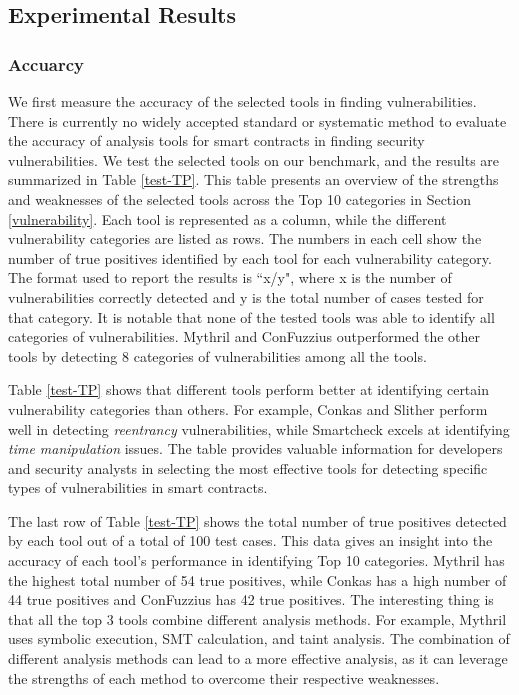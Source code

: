 \documentclass[manuscript,screen]{acmart}
\begin{document}
\subsection{Experimental Results}

\subsubsection{Accuarcy}
We first measure the accuracy of the selected tools in finding vulnerabilities.  There is currently no widely accepted standard or systematic method to evaluate the accuracy of analysis tools for smart contracts in finding security vulnerabilities. 
We test the selected tools on our benchmark, and the results are summarized in Table \ref{test-TP}. This table presents an overview of the strengths and weaknesses of the selected tools across the Top 10 categories in Section \ref{vulnerability}.  Each tool is represented as a column, while the different vulnerability categories are listed as rows. The numbers in each cell show
the number of true positives identified by each tool for each vulnerability category. The format used to report the results is ``x/y", where x is the number of vulnerabilities correctly detected and y is the total number of cases tested for that category.
It is notable that none of the tested tools was able to identify all categories of vulnerabilities. Mythril and ConFuzzius outperformed the other tools by detecting 8 categories of vulnerabilities among all the tools. 

Table \ref{test-TP} shows that different tools perform better at identifying certain vulnerability categories than others. For example, Conkas and Slither perform well in detecting \textit{reentrancy} vulnerabilities, while Smartcheck excels at identifying \textit{time manipulation} issues. The table provides valuable information for developers and security analysts in selecting the most effective tools for detecting specific types of vulnerabilities in smart contracts.

The last row of Table \ref{test-TP} shows the total number of true positives detected by each tool out of a total of 100 test cases. This data gives an insight into the accuracy of each tool's performance in identifying Top 10 categories.
Mythril has the highest total number of 54 true positives, while Conkas has a high number of 44 true positives and ConFuzzius has 42 true positives. The interesting thing is that all the top 3 tools combine different analysis methods. For example, Mythril uses symbolic execution, SMT calculation, and taint analysis. The combination of different analysis methods can lead to a more effective analysis, as it can leverage the strengths of each method to overcome their respective weaknesses. 
\end{document}
